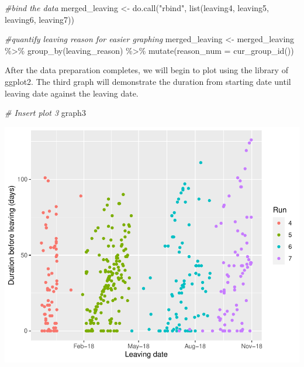 \documentclass[12pt,]{article}
\newenvironment{Shaded}{\begin{snugshade}}{\end{snugshade}}
\newcommand{\AttributeTok}[1]{\textcolor[rgb]{0.77,0.63,0.00}{#1}}
\newcommand{\CommentTok}[1]{\textcolor[rgb]{0.56,0.35,0.01}{\textit{#1}}}
\newcommand{\FunctionTok}[1]{\textcolor[rgb]{0.00,0.00,0.00}{#1}}
\newcommand{\NormalTok}[1]{#1}
\newcommand{\OtherTok}[1]{\textcolor[rgb]{0.56,0.35,0.01}{#1}}
\newcommand{\SpecialCharTok}[1]{\textcolor[rgb]{0.00,0.00,0.00}{#1}}
\newcommand{\StringTok}[1]{\textcolor[rgb]{0.31,0.60,0.02}{#1}}
\begin{document}
\begin{Shaded}
\begin{Highlighting}[]
\CommentTok{\#bind the data}
\NormalTok{merged\_leaving }\OtherTok{\textless{}{-}} \FunctionTok{do.call}\NormalTok{(}\StringTok{"rbind"}\NormalTok{, }\FunctionTok{list}\NormalTok{(leaving4, leaving5, }
\NormalTok{                                        leaving6, leaving7))}

\CommentTok{\#quantify leaving reason for easier graphing}
\NormalTok{merged\_leaving }\OtherTok{\textless{}{-}}\NormalTok{ merged\_leaving }\SpecialCharTok{\%\textgreater{}\%}
  \FunctionTok{group\_by}\NormalTok{(leaving\_reason) }\SpecialCharTok{\%\textgreater{}\%}
  \FunctionTok{mutate}\NormalTok{(}\AttributeTok{reason\_num =} \FunctionTok{cur\_group\_id}\NormalTok{())}
\end{Highlighting}
\end{Shaded}

After the data preparation completes, we will begin to plot using the
library of ggplot2. The third graph will demonstrate the duration from
starting date until leaving date against the leaving date.

\begin{Shaded}
\begin{Highlighting}[]
\CommentTok{\# Insert plot 3}
\NormalTok{graph3}
\end{Highlighting}
\end{Shaded}

\begin{center}\includegraphics{report_files/figure-latex/unnamed-chunk-15-1} \end{center}
\end{document}
